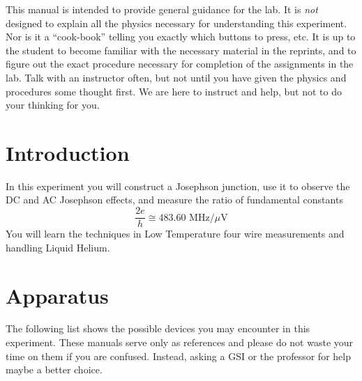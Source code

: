 \documentclass{../lab}
\begin{document}
This manual is intended to provide general guidance for the lab. It is \emph{not} designed to explain all the physics necessary for understanding this experiment. Nor is it a ``cook-book'' telling you exactly which buttons to press, etc. It is up to the student to become familiar with the necessary material in the reprints, and to figure out the exact procedure necessary for completion of the assignments in the lab. Talk with an instructor often, but not until you have given the physics and procedures some thought first. We are here to instruct and help, but not to do your thinking for you.

\section{Introduction}

In this experiment you will construct a Josephson junction, use it to observe the DC and AC Josephson effects, and measure the ratio of fundamental constants
\begin{equation}
    \frac{2e}{h} \cong 483.60 \textrm{ MHz}/\mu \textrm{V}
\end{equation}
You will learn the techniques in Low Temperature four wire measurements and handling Liquid Helium.

\section{Apparatus}
The following list shows the possible devices you may encounter in this experiment. These manuals serve only as references and please do not waste your time on them if you are confused. Instead, asking a GSI or the professor for help maybe a better choice.
\end{document}
